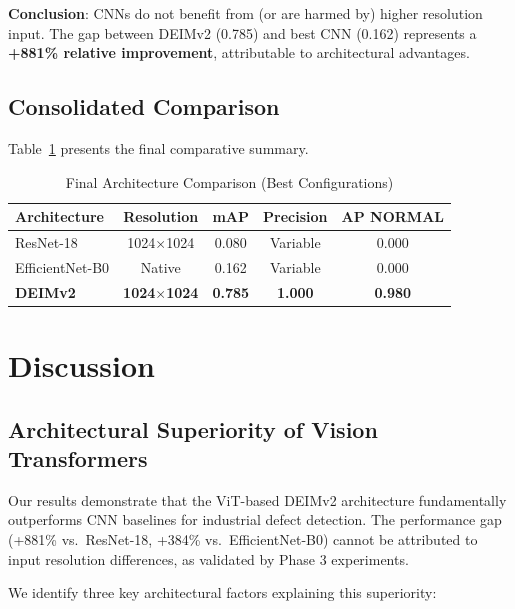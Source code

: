 \documentclass[journal,twoside,web]{ieeecolor}
\begin{document}
\textbf{Conclusion}: CNNs do not benefit from (or are harmed by) higher resolution input. The gap between DEIMv2 (0.785) and best CNN (0.162) represents a \textbf{+881\% relative improvement}, attributable to architectural advantages.

\subsection{Consolidated Comparison}

Table~\ref{tab:final_comparison} presents the final comparative summary.

\begin{table}[htbp]
\centering
\caption{Final Architecture Comparison (Best Configurations)}
\label{tab:final_comparison}
\begin{tabular}{lcccc}
\toprule
\textbf{Architecture} & \textbf{Resolution} & \textbf{mAP} & \textbf{Precision} & \textbf{AP NORMAL} \\
\midrule
ResNet-18 & 1024$\times$1024 & 0.080 & Variable & 0.000 \\
EfficientNet-B0 & Native & 0.162 & Variable & 0.000 \\
\textbf{DEIMv2} & \textbf{1024$\times$1024} & \textbf{0.785} & \textbf{1.000} & \textbf{0.980} \\
\bottomrule
\end{tabular}
\end{table}

\section{Discussion}
\label{sec:discussion}

\subsection{Architectural Superiority of Vision Transformers}

Our results demonstrate that the ViT-based DEIMv2 architecture fundamentally outperforms CNN baselines for industrial defect detection. The performance gap (+881\% vs.\ ResNet-18, +384\% vs.\ EfficientNet-B0) cannot be attributed to input resolution differences, as validated by Phase 3 experiments.

We identify three key architectural factors explaining this superiority:
\end{document}
